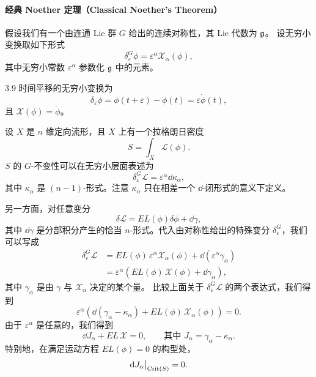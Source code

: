 \paragraph{经典 Noether 定理（Classical Noether's Theorem）}

假设我们有一个由连通 Lie 群 $G$ 给出的连续对称性，其 Lie 代数为 $\mathfrak{g}$。
设无穷小变换取如下形式
\[
  \delta^{G}_{\varepsilon}\phi=\varepsilon^{\alpha}\mathcal{X}_{\alpha}(\phi),
\]
其中无穷小常数 $\varepsilon^{\alpha}$ 参数化 $\mathfrak{g}$ 中的元素。


\begin{wexam}{3.9}
  时间平移的无穷小变换为
  \[
    \delta_{\varepsilon}\phi=\phi(t+\varepsilon)-\phi(t)=\varepsilon\dot\phi(t),
  \]
  且 $\mathcal{X}(\phi)=\dot\phi$。
\end{wexam}

设 $X$ 是 $n$ 维定向流形，且 $X$ 上有一个拉格朗日密度
\[
  S=\int_{X}\mathcal{L}(\phi).
\]
$S$ 的 $G$-不变性可以在无穷小层面表述为
\[
  \delta^{G}_{\varepsilon}\mathcal{L}=\varepsilon^{\alpha}\dd\kappa_{\alpha},
\]
其中 $\kappa_{\alpha}$ 是 $(n-1)$-形式。注意 $\kappa_{\alpha}$ 只在相差一个
$\dd$-闭形式的意义下定义。

另一方面，对任意变分
\[
  \delta\mathcal{L}=EL(\phi)\delta\phi+\dd\gamma,
\]
其中 $\dd\gamma$ 是分部积分产生的恰当 $n$-形式。代入由对称性给出的特殊变分
$\delta^{G}_{\varepsilon}$，我们可以写成
\[
  \begin{aligned}
    \delta^{G}_{\varepsilon}\mathcal{L}
    &=EL(\phi)\,\varepsilon^{\alpha}\mathcal{X}_{\alpha}(\phi)
    +\dd(\varepsilon^{\alpha}\gamma_{\alpha})\\
    &=\varepsilon^{\alpha}\left(EL(\phi)\,\mathcal{X}(\phi)
    +\dd\gamma_{\alpha}\right),
  \end{aligned}
\]
其中 $\gamma_{\alpha}$ 是由 $\gamma$ 与 $\mathcal{X}_{\alpha}$ 决定的某个量。
比较上面关于 $\delta^{G}_{\varepsilon}\mathcal{L}$ 的两个表达式，我们得到
\[
  \varepsilon^{\alpha}\left(\dd(\gamma_{\alpha}-\kappa_{\alpha})
  +EL(\phi)\,\mathcal{X}_{\alpha}(\phi)\right)=0.
\]
由于 $\varepsilon^{\alpha}$ 是任意的，我们得到
\[
  \dd J_{\alpha}+EL\,\mathcal{X}=0,
  \qquad\text{其中 } J_{\alpha}=\gamma_{\alpha}-\kappa_{\alpha}.
\]
特别地，在满足运动方程 $EL(\phi)=0$ 的构型处，
\[
  \mathrm{d} J_{\alpha}\big|_{\operatorname{Crit}(S)}=0.
\]

